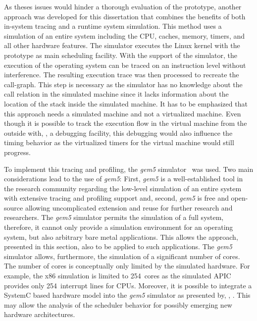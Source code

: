 As theses issues would hinder a thorough evaluation of the \cobas{} prototype, another approach was developed for this dissertation that combines the benefits of both in-system tracing and a runtime system simulation. This method uses a simulation of an entire system including the CPU, caches, memory, timers, and all other hardware features. The simulator executes the Linux kernel with the \cobas{} prototype as main scheduling facility. With the support of the simulator, the execution of the operating system can be traced on an instruction level without interference. The resulting execution trace was then processed to recreate the call-graph. This step is necessary as the simulator has no knowledge about the call relation in the simulated machine since it lacks information about the location of the stack inside the simulated machine. It has to be emphasized that this approach needs a simulated machine and not a virtualized machine. Even though it is possible to track the execution flow in the virtual machine from the outside with, \eg{}, a debugging facility, this debugging would also influence the timing behavior as the virtualized timers for the virtual machine would still progress.

To implement this tracing and profiling, the \emph{gem5} simulator~\cite{Binkert:2011:gem5} was used. Two main considerations lead to the use of \emph{gem5}: First, \emph{gem5} is a well-established tool in the research community regarding the low-level simulation of an entire system with extensive tracing and profiling support and, second, \emph{gem5} is free and open-source allowing uncomplicated extension and reuse for further research and researchers. The \emph{gem5} simulator permits the simulation of a full system, therefore, it cannot only provide a simulation environment for an operating system, but also arbitrary bare metal applications. This allows the approach, presented in this section, also to be applied to such applications. The \emph{gem5} simulator allows, furthermore, the simulation of a significant number of cores. The number of cores is conceptually only limited by the simulated hardware. For example, the x86 simulation is limited to \num{254}~cores as the simulated \ac{APIC} provides only \num{254}~interrupt lines for CPUs. Moreover, it is possible to integrate a SystemC based hardware model into the \emph{gem5} simulator as presented by, \eg{}, \textcite{Jung-2015-Gem5SystemC}. This may allow the analysis of the scheduler behavior for possibly emerging new hardware architectures.

